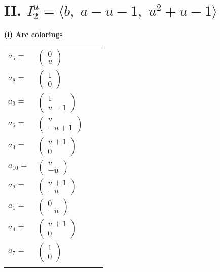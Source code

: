 \documentclass[1p]{elsarticle_modified}
\theoremstyle{definition}
\begin{document}
\centering \section*{II. $I^u_{2}= \langle b,\;a- u-1,\;u^2+u-1 \rangle$}
\flushleft \textbf{(i) Arc colorings}\\
\begin{tabular}{m{7pt} m{180pt} m{7pt} m{180pt} }
\flushright $a_{5}=$&$\begin{pmatrix}0\\u\end{pmatrix}$ \\
\flushright $a_{8}=$&$\begin{pmatrix}1\\0\end{pmatrix}$ \\
\flushright $a_{9}=$&$\begin{pmatrix}1\\u-1\end{pmatrix}$ \\
\flushright $a_{6}=$&$\begin{pmatrix}u\\- u+1\end{pmatrix}$ \\
\flushright $a_{3}=$&$\begin{pmatrix}u+1\\0\end{pmatrix}$ \\
\flushright $a_{10}=$&$\begin{pmatrix}u\\- u\end{pmatrix}$ \\
\flushright $a_{2}=$&$\begin{pmatrix}u+1\\- u\end{pmatrix}$ \\
\flushright $a_{1}=$&$\begin{pmatrix}0\\- u\end{pmatrix}$ \\
\flushright $a_{4}=$&$\begin{pmatrix}u+1\\0\end{pmatrix}$ \\
\flushright $a_{7}=$&$\begin{pmatrix}1\\0\end{pmatrix}$\\&\end{tabular}
\end{document}
